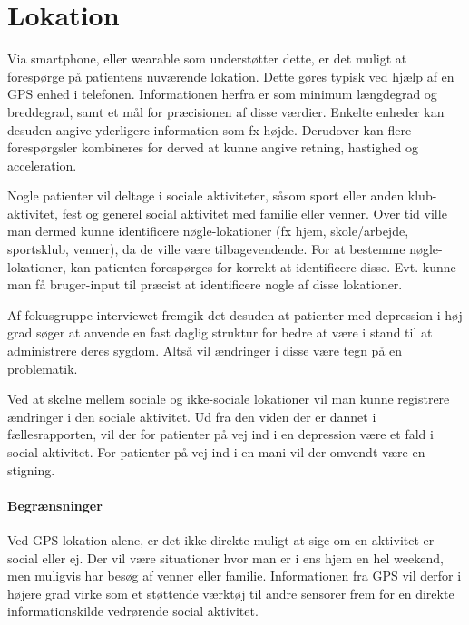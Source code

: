 \section{Lokation}
Via smartphone, eller wearable som understøtter dette, er det muligt at forespørge på patientens nuværende lokation.
Dette gøres typisk ved hjælp af en GPS enhed i telefonen.
Informationen herfra er som minimum længdegrad og breddegrad, samt et mål for præcisionen af disse værdier.
Enkelte enheder kan desuden angive yderligere information som fx højde.
Derudover kan flere forespørgsler kombineres for derved at kunne angive retning, hastighed og acceleration.

Nogle patienter vil deltage i sociale aktiviteter, såsom sport eller anden klub-aktivitet, fest og generel social aktivitet med familie eller venner.
Over tid ville man dermed kunne identificere nøgle-lokationer (fx hjem, skole/arbejde, sportsklub, venner), da de ville være tilbagevendende.
For at bestemme nøgle-lokationer, kan patienten forespørges for korrekt at identificere disse.
Evt. kunne man få bruger-input til præcist at identificere nogle af disse lokationer.

Af fokusgruppe-interviewet fremgik det desuden at patienter med depression i høj grad søger at anvende en fast daglig struktur for bedre at være i stand til at administrere deres sygdom.
Altså vil ændringer i disse være tegn på en problematik.

Ved at skelne mellem sociale og ikke-sociale lokationer vil man kunne registrere ændringer i den sociale aktivitet.
Ud fra den viden der er dannet i fællesrapporten, vil der for patienter på vej ind i en depression være et fald i social aktivitet.
For patienter på vej ind i en mani vil der omvendt være en stigning.

\paragraph{Begrænsninger}
Ved GPS-lokation alene, er det ikke direkte muligt at sige om en aktivitet er social eller ej.
Der vil være situationer hvor man er i ens hjem en hel weekend, men muligvis har besøg af venner eller familie.
Informationen fra GPS vil derfor i højere grad virke som et støttende værktøj til andre sensorer frem for en direkte informationskilde vedrørende social aktivitet.